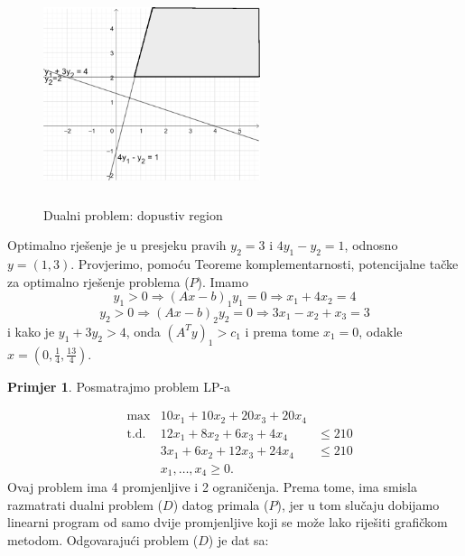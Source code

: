 \documentclass[b5paper, utf8, 11pt, colorlinks]{book}
\theoremstyle{definition}
\newtheorem{primjer}{Primjer}[chapter]
\begin{document}
\begin{figure}[!ht]
	\centering
	\includegraphics[width=180pt, height=180pt]{fig5.eps}
	\caption{Dualni problem: dopustiv region}
	\label{fig:fig5}
\end{figure}

Optimalno rješenje je u presjeku pravih $y_2 = 3$ i $4y_1 - y_2 = 1$, odnosno $y = (1, 3)$. Provjerimo, pomoću Teoreme komplementarnosti, potencijalne tačke za optimalno rješenje problema ($P$). Imamo 
$$y_1 > 0 \Rightarrow (Ax - b)_1 y_1 = 0 \Rightarrow x_1 + 4 x_2 = 4 $$
$$y_2 > 0 \Rightarrow (Ax - b)_2 y_2 = 0 \Rightarrow 3x_1 - x_2 + x_3 = 3 $$
i kako je $y_1 + 3 y_2 > 4$, onda $(A^Ty)_1 > c_1$ i prema tome $x_1 =0$, 
odakle $x =(0, \frac{1}{4}, \frac{13}{4})$. 

\begin{primjer}\label{primjer:dual} Posmatrajmo problem LP-a
\end{primjer}
$$\begin{array}{llll}
	&\max                     &10 x_1 + 10 x_2 + 20 x_3 + 20 x_4  & \\
	&\mbox{t.d. }      &12 x_1 + 8 x_2  + 6 x_3  + 4 x_4   & \leq 210 \\
	&                        &3 x_1 + 6 x_2   + 12 x_3 + 24 x_4 & \leq 210 \\
	&                       & x_1,\ldots, x_4 \geq 0.                                 &
\end{array}
$$
Ovaj problem ima 4 promjenljive i 2 ograničenja. Prema tome, ima smisla razmatrati dualni problem  ($D$)  datog primala  ($P$),  jer u tom slučaju dobijamo linearni program od samo dvije promjenljive koji se može lako riješiti grafičkom metodom.  Odgovarajući problem ($D$) je dat sa:
\end{document}
